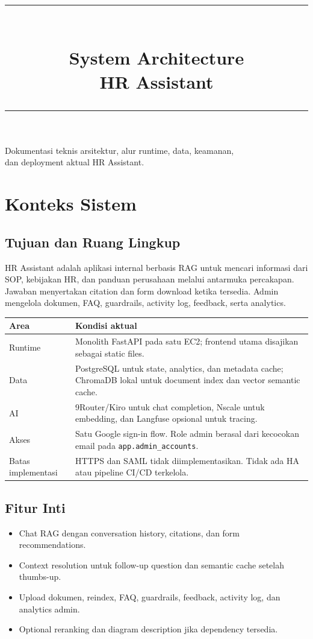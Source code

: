 \documentclass[11pt,a4paper]{article}
\title{%
  \vspace{-1cm}
  {\color{Red}\rule{\textwidth}{2pt}}\\[0.8cm]
  {\Huge\bfseries\color{Ink} System Architecture}\\[0.3cm]
  {\LARGE\color{Red} HR Assistant}\\[0.5cm]
  {\color{Red}\rule{\textwidth}{2pt}}
}
\author{}
\date{}
\begin{document}
\maketitle
\thispagestyle{empty}
\vfill
\begin{center}
\color{Muted}\small
Dokumentasi teknis arsitektur, alur runtime, data, keamanan,\\
dan deployment aktual HR Assistant.
\end{center}

\newpage
\tableofcontents

\newpage
\section{Konteks Sistem}
\subsection{Tujuan dan Ruang Lingkup}
HR Assistant adalah aplikasi internal berbasis RAG untuk mencari informasi dari SOP, kebijakan HR, dan panduan perusahaan melalui antarmuka percakapan. Jawaban menyertakan citation dan form download ketika tersedia. Admin mengelola dokumen, FAQ, guardrails, activity log, feedback, serta analytics.

\begin{tabularx}{\linewidth}{@{}p{4cm}X@{}}
\toprule \textbf{Area} & \textbf{Kondisi aktual} \\ \midrule
Runtime & Monolith FastAPI pada satu EC2; frontend utama disajikan sebagai static files. \\
Data & PostgreSQL untuk state, analytics, dan metadata cache; ChromaDB lokal untuk document index dan vector semantic cache. \\
AI & 9Router/Kiro untuk chat completion, Nscale untuk embedding, dan Langfuse opsional untuk tracing. \\
Akses & Satu Google sign-in flow. Role admin berasal dari kecocokan email pada \texttt{app.admin\_accounts}. \\
Batas implementasi & HTTPS dan SAML tidak diimplementasikan. Tidak ada HA atau pipeline CI/CD terkelola. \\
\bottomrule
\end{tabularx}

\subsection{Fitur Inti}
\begin{itemize}
  \item Chat RAG dengan conversation history, citations, dan form recommendations.
  \item Context resolution untuk follow-up question dan semantic cache setelah thumbs-up.
  \item Upload dokumen, reindex, FAQ, guardrails, feedback, activity log, dan analytics admin.
  \item Optional reranking dan diagram description jika dependency tersedia.
\end{itemize}
\end{document}
